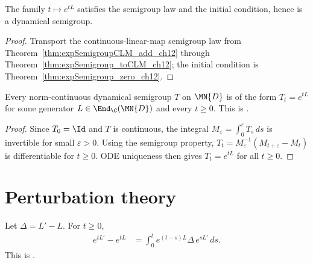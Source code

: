 \begin{theorem}
    \label{thm:expSemigroup_isDynSemigroup_ch12}
    \leanok
    The family $t \mapsto e^{tL}$ satisfies the semigroup law and the initial
    condition, hence is a dynamical semigroup.
\end{theorem}

\begin{proof}
    \leanok
    Transport the continuous-linear-map semigroup law from
    Theorem~\ref{thm:expSemigroupCLM_add_ch12} through
    Theorem~\ref{thm:expSemigroup_toCLM_ch12}; the initial condition is
    Theorem~\ref{thm:expSemigroup_zero_ch12}.
\end{proof}

\begin{theorem}
    \label{thm:continuousDynSemigroup_eq_exp_ch12}
    \leanok
    Every norm-continuous dynamical semigroup $T$ on $\MN{D}$ is
    of the form $T_t = e^{tL}$ for some generator
    $L \in \End_{\C}(\MN{D})$ and every $t \ge 0$.
    This is \cite[Proposition~7.1]{Wolf2012Quantum}.
\end{theorem}

\begin{proof}
    \leanok
    Since $T_0 = \Id$ and $T$ is continuous, the integral
    $M_\varepsilon = \int_0^\varepsilon T_s\,ds$ is invertible for small
    $\varepsilon > 0$.
    Using the semigroup property,
    $T_t = M_\varepsilon^{-1}(M_{t+\varepsilon} - M_t)$
    is differentiable for $t \ge 0$.
    ODE uniqueness then gives $T_t = e^{tL}$ for all $t \ge 0$.
\end{proof}

\section{Perturbation theory}
\label{sec:perturbation}

\begin{theorem}\label{thm:duhamel_formula_ch12}
    \leanok
    Let $\Delta = L' - L$. For $t \ge 0$,
    \begin{align}
        e^{tL'} - e^{tL}
        &= \int_0^t e^{(t-s)L} \Delta\,e^{sL'}\,ds.
        \label{eq:semigroup_duhamel}
    \end{align}
    This is \cite[Lemma~7.1]{Wolf2012Quantum}.
\end{theorem}

